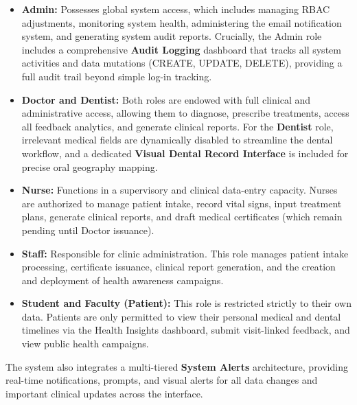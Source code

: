 \begin{itemize}
    \item \textbf{Admin:} Possesses global system access, which includes managing RBAC adjustments, monitoring system health, administering the email notification system, and generating system audit reports. Crucially, the Admin role includes a comprehensive \textbf{Audit Logging} dashboard that tracks all system activities and data mutations (CREATE, UPDATE, DELETE), providing a full audit trail beyond simple log-in tracking.
    \item \textbf{Doctor and Dentist:} Both roles are endowed with full clinical and administrative access, allowing them to diagnose, prescribe treatments, access all feedback analytics, and generate clinical reports. For the \textbf{Dentist} role, irrelevant medical fields are dynamically disabled to streamline the dental workflow, and a dedicated \textbf{Visual Dental Record Interface} is included for precise oral geography mapping.
    \item \textbf{Nurse:} Functions in a supervisory and clinical data-entry capacity. Nurses are authorized to manage patient intake, record vital signs, input treatment plans, generate clinical reports, and draft medical certificates (which remain pending until Doctor issuance).
    \item \textbf{Staff:} Responsible for clinic administration. This role manages patient intake processing, certificate issuance, clinical report generation, and the creation and deployment of health awareness campaigns.
    \item \textbf{Student and Faculty (Patient):} This role is restricted strictly to their own data. Patients are only permitted to view their personal medical and dental timelines via the Health Insights dashboard, submit visit-linked feedback, and view public health campaigns.
\end{itemize}

The system also integrates a multi-tiered \textbf{System Alerts} architecture, providing real-time notifications, prompts, and visual alerts for all data changes and important clinical updates across the interface.

